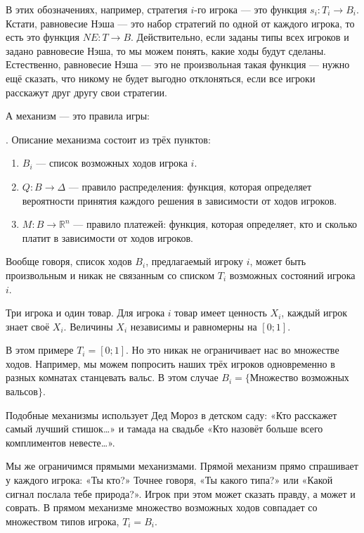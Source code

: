 В этих обозначениях, например, стратегия $ i $-го игрока — это функция $ s_{i}:T_{i}\to B_{i} $. Кстати, равновесие Нэша — это набор стратегий по одной от каждого игрока, то есть это функция $ NE:T\to B $. Действительно, если заданы типы всех игроков и задано равновесие Нэша, то мы можем понять, какие ходы будут сделаны. Естественно, равновесие Нэша — это не произвольная такая функция — нужно ещё сказать, что никому не будет выгодно отклоняться, если все игроки расскажут друг другу свои стратегии.

А механизм — это правила игры:

\begin{mydef} . Описание механизма состоит из трёх пунктов:
\begin{enumerate}
\item $ B_{i} $ — список возможных ходов игрока $ i $.
\item $Q:B\to \Delta  $ — правило распределения: функция, которая определяет вероятности принятия каждого решения в зависимости от ходов игроков.
\item $M:B\to \mathbb{R}^{n}  $ — правило платежей: функция, которая определяет, кто и сколько платит в зависимости от ходов игроков.
\end{enumerate}
\end{mydef}

Вообще говоря, список ходов $ B_{i} $, предлагаемый игроку $ i $, может быть произвольным и никак не связанным со списком $ T_{i} $ возможных состояний игрока $ i $.

\begin{myex}
Три игрока и один товар. Для игрока $ i $ товар имеет ценность $ X_{i} $, каждый игрок знает своё $ X_{i} $. Величины $ X_{i}  $ независимы и равномерны на $ [0;1] $.

В этом примере $ T_{i}=[0;1] $. Но это никак не ограничивает нас во множестве ходов. Например, мы можем попросить наших трёх игроков одновременно в разных комнатах станцевать вальс. В этом случае $B_{i} =\{ $Множество возможных вальсов$\}$.
\end{myex}

Подобные механизмы использует Дед Мороз в детском саду: «Кто расскажет самый лучший стишок\ldots» и тамада на свадьбе «Кто назовёт больше всего комплиментов невесте\ldots».

Мы же ограничимся прямыми механизмами. Прямой механизм прямо спрашивает у каждого игрока: «Ты кто?» Точнее говоря, «Ты какого типа?» или «Какой сигнал послала тебе природа?». Игрок при этом может сказать правду, а может и соврать. В прямом механизме множество возможных ходов совпадает со множеством типов игрока, $ T_{i}=B_{i} $.

